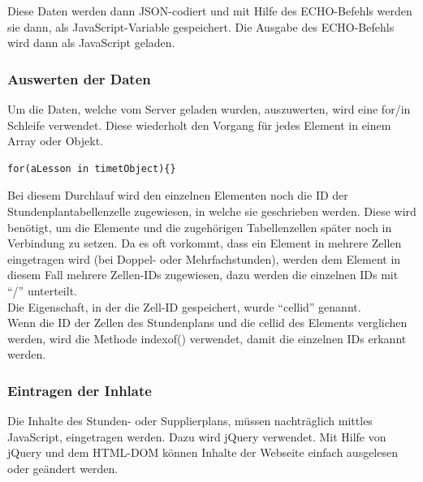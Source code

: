 Diese Daten werden dann JSON-codiert und mit Hilfe des ECHO-Befehls werden sie dann, als JavaScript-Variable gespeichert. Die Ausgabe des ECHO-Befehls wird dann als JavaScript geladen.

	


\subsubsection{Auswerten der Daten}

Um die Daten, welche vom Server geladen wurden, auszuwerten, wird eine for/in Schleife verwendet. Diese wiederholt den Vorgang für jedes Element in einem Array oder Objekt.

\begin{lstlisting}
for(aLesson in timetObject){}
\end{lstlisting}

Bei diesem Durchlauf wird den einzelnen Elementen noch die ID der Stundenplantabellenzelle zugewiesen, in welche sie geschrieben werden. Diese wird benötigt, um die Elemente und die zugehörigen Tabellenzellen später noch in Verbindung zu setzen. Da es oft vorkommt, dass ein Element in mehrere Zellen eingetragen wird (bei Doppel- oder Mehrfachstunden), werden dem Element in diesem Fall mehrere Zellen-IDs zugewiesen, dazu werden die einzelnen IDs mit \enquote{/} unterteilt.\\
Die Eigenschaft, in der die Zell-ID gespeichert, wurde \enquote{cellid} genannt.\\



Wenn die ID der Zellen des Stundenplans und die cellid des Elements verglichen werden, wird die Methode indexof() verwendet, damit die einzelnen IDs erkannt werden.\\



\subsubsection{Eintragen der Inhlate}

Die Inhalte des Stunden- oder Supplierplans, müssen nachträglich mittles JavaScript, eingetragen werden. Dazu wird jQuery verwendet. Mit Hilfe von jQuery und dem HTML-DOM können Inhalte der Webseite einfach ausgelesen oder geändert werden.

